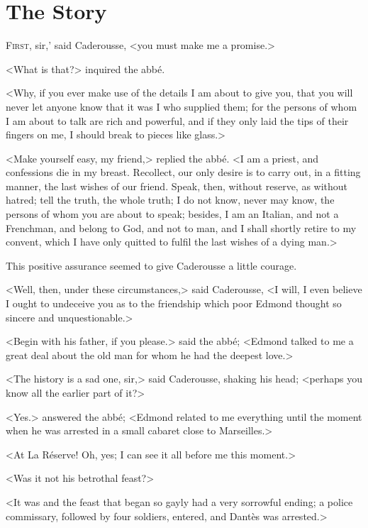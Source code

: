 \chapter{The Story} 

 \lettrine[ante=`]{F}{irst}, sir,' said Caderousse, <you must make me a promise.> 

\zz
 <What is that?> inquired the abbé. 

\zz
 <Why, if you ever make use of the details I am about to give you, that you will never let anyone know that it was I who supplied them; for the persons of whom I am about to talk are rich and powerful, and if they only laid the tips of their fingers on me, I should break to pieces like glass.> 

 <Make yourself easy, my friend,> replied the abbé. <I am a priest, and confessions die in my breast. Recollect, our only desire is to carry out, in a fitting manner, the last wishes of our friend. Speak, then, without reserve, as without hatred; tell the truth, the whole truth; I do not know, never may know, the persons of whom you are about to speak; besides, I am an Italian, and not a Frenchman, and belong to God, and not to man, and I shall shortly retire to my convent, which I have only quitted to fulfil the last wishes of a dying man.> 

 This positive assurance seemed to give Caderousse a little courage. 

 <Well, then, under these circumstances,> said Caderousse, <I will, I even believe I ought to undeceive you as to the friendship which poor Edmond thought so sincere and unquestionable.> 

 <Begin with his father, if you please.> said the abbé; <Edmond talked to me a great deal about the old man for whom he had the deepest love.> 

 <The history is a sad one, sir,> said Caderousse, shaking his head; <perhaps you know all the earlier part of it?> 

 <Yes.> answered the abbé; <Edmond related to me everything until the moment when he was arrested in a small cabaret close to Marseilles.> 

 <At La Réserve! Oh, yes; I can see it all before me this moment.> 

 <Was it not his betrothal feast?> 

 <It was and the feast that began so gayly had a very sorrowful ending; a police commissary, followed by four soldiers, entered, and Dantès was arrested.> 

